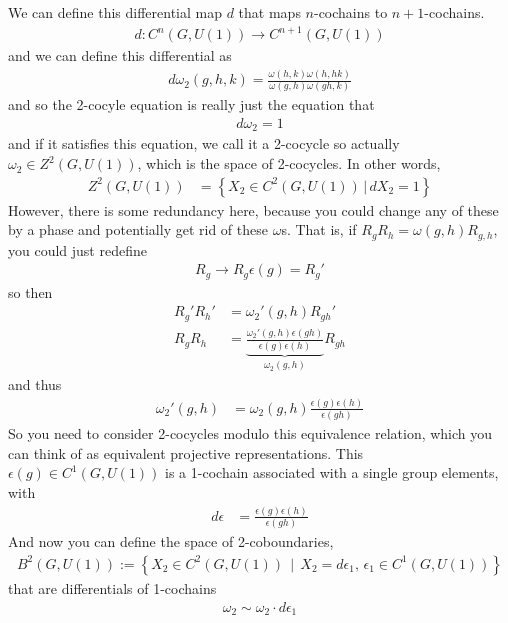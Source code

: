 We can define this differential map $d$ that maps $n$-cochains to
$n+1$-cochains.
\begin{align}
    d: C^n(G, U(1)) \to C^{n+1}(G, U(1))
\end{align}
and we can define this differential as
\begin{align}
    d\omega_2 (g, h, k)
    =
    \frac{\omega(h, k) \omega(h, hk)}{\omega(g, h) \omega(gh, k)}
\end{align}
and so the 2-cocyle equation is really just the equation that
\begin{align}
    d\omega_2 = 1
\end{align}
and if it satisfies this equation,
we call it a 2-cocycle
so actually
$\omega_2 \in Z^2(G, U(1))$,
which is the space of 2-cocycles.
In other words,
\begin{align}
    Z^2(G, U(1)) &=
    \left\{
    X_2 \in C^2(G, U(1)) \,|\,
    dX_2 = 1
    \right\}
\end{align}
However,
there is some redundancy here,
because you could change any of these by a phase and potentially get rid of
these $\omega$s.
That is,
if $R_g R_h = \omega(g, h) R_{g,h}$,
you could just redefine
\begin{align}
    R_g \to R_g \epsilon(g) = R_g'
\end{align}
so then
\begin{align}
    R_g' R_h' &= \omega_2'(g, h) R_{gh}'\\
    R_g R_h &=
    \underbrace{\frac{\omega_2'(g, h) \epsilon(gh)}{\epsilon(g)
    \epsilon(h)}}_{\omega_2(g, h)} R_{gh}
\end{align}
and thus
\begin{align}
    \omega_2'(g,h) &=
    \omega_2(g, h) \frac{\epsilon(g) \epsilon(h)}{\epsilon(gh)}
\end{align}
So you need to consider 2-cocycles modulo this equivalence relation,
which you can think of as equivalent projective representations.
This $\epsilon(g)\in C^1(G, U(1))$ is a 1-cochain associated with a single group
elements,
with
\begin{align}
    d\epsilon &=
    \frac{\epsilon(g) \epsilon(h)}{\epsilon(gh)}
\end{align}
And now you can define the space of 2-coboundaries,
\begin{align}
    B^2(G, U(1)) := \left\{ 
    X_2 \in C^2(G, U(1)) \, \mid\,
    X_2 = d\epsilon_1,\,
    \epsilon_1 \in C^1(G, U(1))
    \right\}
\end{align}
that are differentials of 1-cochains
\begin{align}
    \omega_2 \sim \omega_2 \cdot d\epsilon_1
\end{align}

